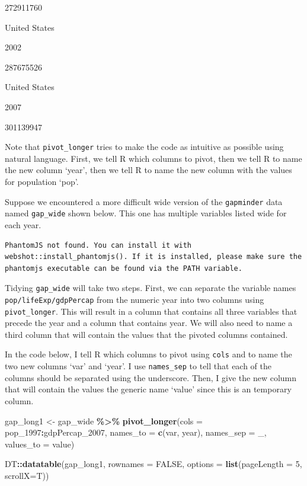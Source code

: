 \documentclass[
]{book}
\makeatletter
\newenvironment{Shaded}{\begin{snugshade}}{\end{snugshade}}
\newcommand{\AttributeTok}[1]{\textcolor[rgb]{0.27,0.27,0.27}{#1}}
\newcommand{\ConstantTok}[1]{\textcolor[rgb]{0.37,0.37,0.37}{#1}}
\newcommand{\DecValTok}[1]{\textcolor[rgb]{0.06,0.06,0.06}{#1}}
\newcommand{\FunctionTok}[1]{\textcolor[rgb]{0.27,0.27,0.27}{\textbf{#1}}}
\newcommand{\NormalTok}[1]{#1}
\newcommand{\OtherTok}[1]{\textcolor[rgb]{0.37,0.37,0.37}{#1}}
\newcommand{\SpecialCharTok}[1]{\textcolor[rgb]{0.43,0.43,0.43}{\textbf{#1}}}
\newcommand{\StringTok}[1]{\textcolor[rgb]{0.5,0.5,0.5}{#1}}
\newenvironment{kframe}{%
\medskip{}
\setlength{\fboxsep}{.8em}
 \def\at@end@of@kframe{}%
 \ifinner\ifhmode%
  \def\at@end@of@kframe{\end{minipage}}%
  \begin{minipage}{\columnwidth}%
 \fi\fi%
 \def\FrameCommand##1{\hskip\@totalleftmargin \hskip-\fboxsep
 \colorbox{shadecolor}{##1}\hskip-\fboxsep
     \hskip-\linewidth \hskip-\@totalleftmargin \hskip\columnwidth}%
 \MakeFramed {\advance\hsize-\width
   \@totalleftmargin\z@ \linewidth\hsize
   \@setminipage}}%
 {\par\unskip\endMakeFramed%
 \at@end@of@kframe}
\renewenvironment{Shaded}{\begin{kframe}}{\end{kframe}}
\makeatother
\begin{document}
272911760

United States

2002

287675526

United States

2007

301139947

Note that \texttt{pivot\_longer} tries to make the code as intuitive as possible using natural language. First, we tell R which columns to pivot, then we tell R to name the new column `year', then we tell R to name the new column with the values for population `pop'.

Suppose we encountered a more difficult wide version of the \texttt{gapminder} data named \texttt{gap\_wide} shown below. This one has multiple variables listed wide for each year.

\begin{verbatim}
PhantomJS not found. You can install it with webshot::install_phantomjs(). If it is installed, please make sure the phantomjs executable can be found via the PATH variable.
\end{verbatim}

Tidying \texttt{gap\_wide} will take two steps. First, we can separate the variable names \texttt{pop/lifeExp/gdpPercap} from the numeric year into two columns using \texttt{pivot\_longer}. This will result in a column that contains all three variables that precede the year and a column that contains year. We will also need to name a third column that will contain the values that the pivoted columns contained.

In the code below, I tell R which columns to pivot using \texttt{cols} and to name the two new columns `var' and `year'. I use \texttt{names\_sep} to tell that each of the columns should be separated using the underscore. Then, I give the new column that will contain the values the generic name `value' since this is an temporary column.

\begin{Shaded}
\begin{Highlighting}[]
\NormalTok{gap\_long1 }\OtherTok{\textless{}{-}}\NormalTok{ gap\_wide }\SpecialCharTok{\%\textgreater{}\%} 
  \FunctionTok{pivot\_longer}\NormalTok{(}\AttributeTok{cols =}\NormalTok{ pop\_1997}\SpecialCharTok{:}\NormalTok{gdpPercap\_2007,}
               \AttributeTok{names\_to =} \FunctionTok{c}\NormalTok{(}\StringTok{\textquotesingle{}var\textquotesingle{}}\NormalTok{, }\StringTok{\textquotesingle{}year\textquotesingle{}}\NormalTok{),}
               \AttributeTok{names\_sep =} \StringTok{\textquotesingle{}\_\textquotesingle{}}\NormalTok{,}
               \AttributeTok{values\_to =} \StringTok{\textquotesingle{}value\textquotesingle{}}\NormalTok{)}

\NormalTok{DT}\SpecialCharTok{::}\FunctionTok{datatable}\NormalTok{(gap\_long1, }\AttributeTok{rownames =} \ConstantTok{FALSE}\NormalTok{, }\AttributeTok{options =} \FunctionTok{list}\NormalTok{(}\AttributeTok{pageLength =} \DecValTok{5}\NormalTok{, }\AttributeTok{scrollX=}\NormalTok{T))}
\end{Highlighting}
\end{Shaded}
\end{document}
